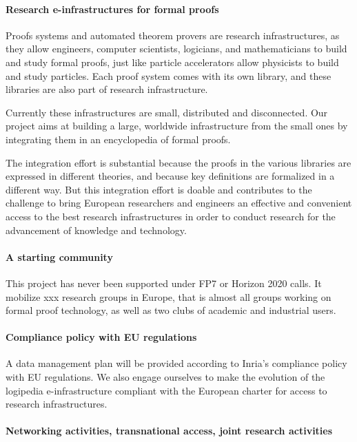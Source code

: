 \paragraph{Research e-infrastructures for formal proofs}

Proofs systems and automated theorem provers are research
infrastructures, as they allow engineers, computer scientists, logicians, and
mathematicians to build and study formal proofs, just like particle
accelerators allow physicists to build and study particles. Each proof
system comes with its own library, and these libraries are also
part of research infrastructure.

Currently these infrastructures are small, distributed and
disconnected.  Our project aims at building a large, worldwide
infrastructure from the small ones by integrating them in an
encyclopedia of formal proofs.

The integration effort is substantial because the proofs in the
various libraries are expressed in different theories, and because
key definitions are formalized in a different way.
%
But this
integration effort is doable and contributes to the challenge to bring
European researchers and engineers an effective and convenient access
to the best research infrastructures in order to conduct research for
the advancement of knowledge and technology.

\paragraph{A starting community}

This project has never been supported under FP7 or Horizon 2020 calls.
It mobilize xxx research groups in Europe, that is almost all groups
working on formal proof technology, as well as two clubs of academic
and industrial users.

\paragraph{Compliance policy with EU regulations}

A data management plan will be provided according to Inria’s
compliance policy with EU regulations. We also engage ourselves to
make the evolution of the logipedia e-infrastructure compliant with
the European charter for access to research infrastructures.

\paragraph{Networking activities, transnational access, joint research activities}

